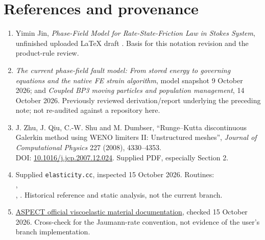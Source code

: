 \documentclass[10pt,letterpaper]{article}
\begin{document}
\section*{References and provenance}
\begin{enumerate}
\item Yimin Jin, \emph{Phase-Field Model for Rate-State-Friction Law in Stokes System}, unfinished uploaded LaTeX draft . Basis for this notation revision and the product-rule review.
\item \emph{The current phase-field fault model: From stored energy to governing equations and the native FE strain algorithm}, model snapshot 9 October 2026; and \emph{Coupled BP3 moving particles and population management}, 14 October 2026. Previously reviewed derivation/report underlying the preceding note; not re-audited against a repository here.
\item J. Zhu, J. Qiu, C.-W. Shu and M. Dumbser, ``Runge--Kutta discontinuous Galerkin method using WENO limiters II: Unstructured meshes'', \emph{Journal of Computational Physics} 227 (2008), 4330--4353.\\ DOI: \href{https://doi.org/10.1016/j.jcp.2007.12.024}{10.1016/j.jcp.2007.12.024}. Supplied PDF, especially Section 2.
\item Supplied \texttt{elasticity.cc}, inspected 15 October 2026. Routines:\\ ,\\ , . Historical reference and static analysis, not the current branch.
\item \href{https://aspect-documentation.readthedocs.io/en/latest/doxygen/classaspect_1_1MaterialModel_1_1Viscoelastic.html}{ASPECT official viscoelastic material documentation}, checked 15 October 2026. Cross-check for the Jaumann-rate convention, not evidence of the user's branch implementation.
\end{enumerate}
\end{document}
